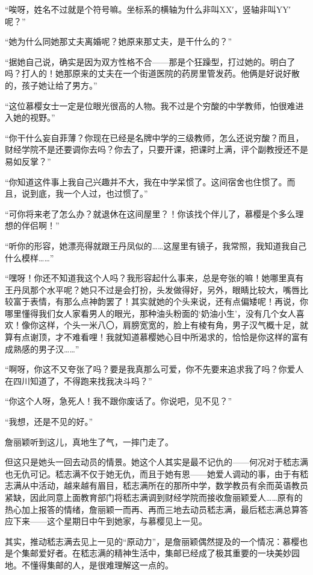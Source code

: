 \par “唉呀，姓名不过就是个符号嘛。坐标系的横轴为什么非叫XX′，竖轴非叫YY′呢？”
\par “她为什么同她那丈夫离婚呢？她原来那丈夫，是干什么的？”
\par “据她自己说，确实是因为双方性格不合——那是个狂躁型，打过她的。明白了吗？打人的！她那原来的丈夫在一个街道医院的药房里管发药。他俩是好说好散的，孩子她让给了男方。”
\par “这位慕樱女士一定是位眼光很高的人物。我不过是个穷酸的中学教师，怕很难进入她的视野。”
\par “你干什么妄自菲薄？你现在已经是名牌中学的三级教师，怎么还说穷酸？而且，财经学院不是还要调你去吗？你去了，只要开课，把课时上满，评个副教授还不是易如反掌？”
\par “你知道这件事上我自己兴趣并不大，我在中学呆惯了。这间宿舍也住惯了。而且，说到底，我一个人过，也过惯了。”
\par “可你将来老了怎么办？就退休在这间屋里？！你该找个伴儿了，慕樱是个多么理想的伴侣啊！”
\par “听你的形容，她漂亮得就跟王丹凤似的……这屋里有镜子，我常照，我知道我自己什么模样……”
\par “嘿呀！你还不知道我这个人吗？我形容起什么事来，总是夸张的嘛！她哪里真有王丹凤那个水平呢？她只不过是会打扮，头发做得好，另外，眼睛比较大，嘴唇比较富于表情，有那么点神韵罢了！其实就她的个头来说，还有点偏矮呢！再说，你哪里懂得我们女人家看男人的眼光，那种油头粉面的‘奶油小生’，没有几个女人喜欢！像你这样，个头一米八〇，肩膀宽宽的，脸上有棱有角，男子汉气概十足，就算有点谢顶，才不难看哩！我就知道慕樱她心目中所渴求的，恰恰是你这样的富有成熟感的男子汉……”
\par “啊呀，你这不又夸张了吗？要是我真那么可爱，你不先要来追求我了吗？你爱人在四川知道了，不得跑来找我决斗吗？”
\par “你这个人呀，急死人！我不跟你废话了。你说吧，见不见？”
\par “我想，还是不见的好。”
\par 詹丽颖听到这儿，真地生了气，一摔门走了。
\par 但这只是她头一回去动员的情景。她这个人其实是最不记仇的——何况对于嵇志满也无仇可记。嵇志满不仅于她无仇，而且于她有恩——她爱人调动的事，由于有嵇志满从中活动，越来越有眉目，嵇志满所在的那所中学，数学教员有余而英语教员紧缺，因此同意上面教育部门将嵇志满调到财经学院而接收詹丽颖爱人……原有的热心加上报答的情绪，詹丽颖一而再、再而三地去动员嵇志满，最后嵇志满总算答应下来——这个星期日中午到她家，与慕樱见上一见。
\par 其实，推动嵇志满去见上一见的“原动力”，是詹丽颖偶然提及的一个情况：慕樱也是个集邮爱好者。在嵇志满的精神生活中，集邮已经成了极其重要的一块美妙园地。不懂得集邮的人，是很难理解这一点的。
